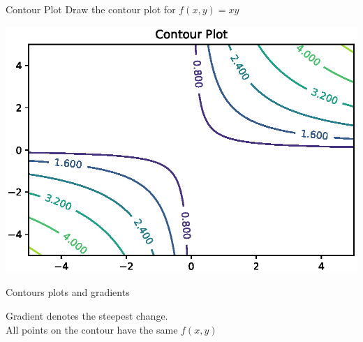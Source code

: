 \documentclass{beamer}
\begin{document}
\begin{frame}{Contour Plot}
    Draw the contour plot for $f(x,y) = xy$\\
        \begin{center}
     \includegraphics[totalheight=6cm]{ml-maths/contour-plot-5.eps}
 \end{center}
\end{frame}



\begin{frame}{Contours plots and gradients}
    
    
    Gradient denotes the steepest change.\\
    All points on the contour have the same $f(x,y)$\\
    
    
\end{frame}
\end{document}
